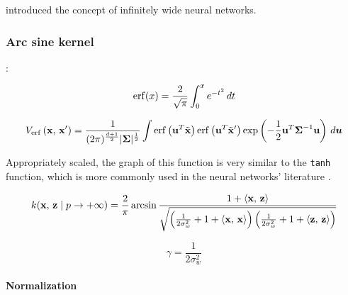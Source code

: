 \Textcite{williamsComputationInfiniteNeural1998} introduced the concept of
infinitely wide neural networks.

\textcite{nealBayesianLearningNeural1996}

\subsubsection{Arc sine kernel}

\textcite{frenayParameterinsensitiveKernelExtreme2011,williamsComputationInfiniteNeural1998}:


\begin{equation}\label{eq:erf}
    \operatorname{erf}(x) = \frac{2}{\sqrt{\pi}} \int_0^x e^{-t^2} \,dt
\end{equation}


\begin{equation}
    V_{\operatorname{erf}}\left(\mathbf{x},\,\mathbf{x}'\right) =
    \frac{1}{(2\pi)^{\frac{d+1}{2}} |\boldsymbol \Sigma|^{\frac{1}{2}}}
    \int
        \operatorname{erf} \left(\mathbf{u} ^T \tilde {\mathbf{x}} \right)
        \operatorname{erf} \left(\mathbf{u} ^T \tilde {\mathbf{x}} '\right)
        \exp \left(
            -\frac{1}{2} \mathbf{u} ^T \boldsymbol \Sigma^{-1} \mathbf{u}
        \right)
    \,d\boldsymbol u
\end{equation}

Appropriately scaled, the graph of this function is very similar to the \texttt{tanh} function,
which is more commonly used in the neural networks' literature
\cite{williamsComputationInfiniteNeural1998}.

\begin{equation}\label{eq:kernel_asin}
	k(\mathbf{x},\,\mathbf{z} \mid p \to + \infty)  = \frac{2}{\pi}
	\arcsin \frac{1 + \left\langle \mathbf{x},\,\mathbf{z} \right\rangle}{\sqrt{
			\left(
			\frac{1}{2\sigma_w^2} + 1 + \left\langle \mathbf{x},\,\mathbf{x} \right\rangle
			\right)
			\left(
			\frac{1}{2\sigma_w^2} + 1 + \left\langle \mathbf{z},\,\mathbf{z} \right\rangle
			\right)
		}}
\end{equation}

\begin{equation}
	\gamma = \frac{1}{2\sigma_w^2}
\end{equation}

\paragraph{Normalization}

